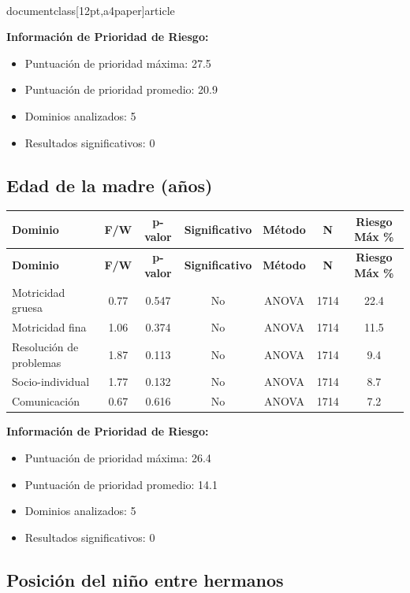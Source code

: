 \\documentclass[12pt,a4paper]{article}
\begin{document}
\textbf{Información de Prioridad de Riesgo:}
\begin{itemize}
\item Puntuación de prioridad máxima: 27.5
\item Puntuación de prioridad promedio: 20.9
\item Dominios analizados: 5
\item Resultados significativos: 0
\end{itemize}


\subsection{Edad de la madre (años)}


\begin{longtable}{|l|c|c|c|c|c|c|}
\hline
\textbf{Dominio} & \textbf{F/W} & \textbf{p-valor} & \textbf{Significativo} & \textbf{Método} & \textbf{N} & \textbf{Riesgo Máx \%} \\
\hline
\endfirsthead

\hline
\textbf{Dominio} & \textbf{F/W} & \textbf{p-valor} & \textbf{Significativo} & \textbf{Método} & \textbf{N} & \textbf{Riesgo Máx \%} \\
\hline
\endhead

\hline
\endfoot

\hline
\endlastfoot

Motricidad gruesa & 0.77 & 0.547 & No & ANOVA & 1714 & 22.4 \\
Motricidad fina & 1.06 & 0.374 & No & ANOVA & 1714 & 11.5 \\
Resolución de problemas & 1.87 & 0.113 & No & ANOVA & 1714 & 9.4 \\
Socio-individual & 1.77 & 0.132 & No & ANOVA & 1714 & 8.7 \\
Comunicación & 0.67 & 0.616 & No & ANOVA & 1714 & 7.2 \\

\end{longtable}


\textbf{Información de Prioridad de Riesgo:}
\begin{itemize}
\item Puntuación de prioridad máxima: 26.4
\item Puntuación de prioridad promedio: 14.1
\item Dominios analizados: 5
\item Resultados significativos: 0
\end{itemize}


\subsection{Posición del niño entre hermanos}
\end{document}
